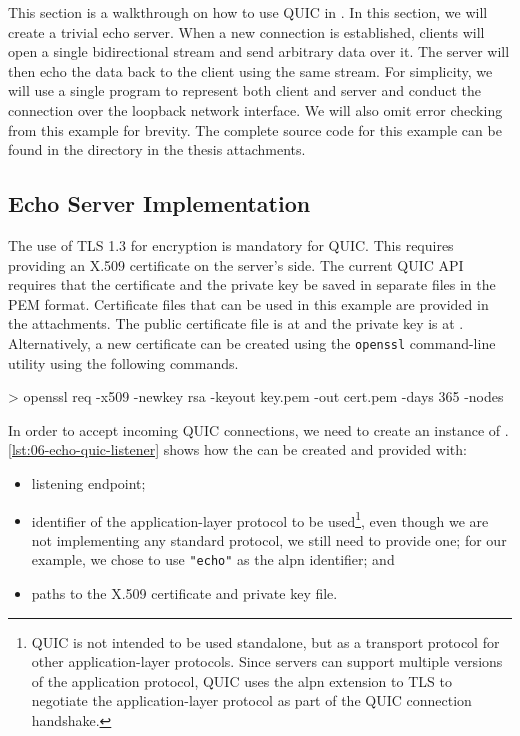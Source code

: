 This section is a walkthrough on how to use QUIC in \dotnet{}. In this section, we will create a
trivial echo server. When a new connection is established, clients will open a single bidirectional
stream and send arbitrary data over it. The server will then echo the data back to the client using
the same stream. For simplicity, we will use a single \dotnet{} program to represent both client and
server and conduct the connection over the loopback network interface. We will also omit error
checking from this example for brevity. The complete source code for this example can be found in
the  directory in the thesis attachments.

\subsection{Echo Server Implementation}

The use of TLS 1.3 for encryption is mandatory for QUIC\@. This requires providing an X.509
certificate on the server's side. The current QUIC API requires that the certificate and the private
key be saved in separate files in the PEM format. Certificate files that can be used in this example
are provided in the attachments. The public certificate file is at  and the
private key is at . Alternatively, a new certificate can be created using
the \texttt{openssl} command-line utility using the following commands.

\begin{myVerbatim}
> openssl req -x509 -newkey rsa -keyout key.pem -out cert.pem -days 365 -nodes
\end{myVerbatim}

In order to accept incoming QUIC connections, we need to create an instance of \QuicListener{}.
\autoref{lst:06-echo-quic-listener} shows how the \QuicListener{} can be created and provided with:

\begin{itemize}

  \item listening endpoint;

  \item identifier of the application-layer protocol to be used\footnote{QUIC is not intended to be
        used standalone, but as a transport protocol for other application-layer protocols. Since
        servers can support multiple versions of the application protocol, QUIC uses the \gls{alpn}
        extension to TLS to negotiate the application-layer protocol as part of the QUIC connection
        handshake.}, even though we are not implementing any standard protocol, we still need to
        provide one; for our example, we chose to use \texttt{"echo"} as the \gls{alpn} identifier;
        and

  \item paths to the X.509 certificate and private key file.

\end{itemize}

